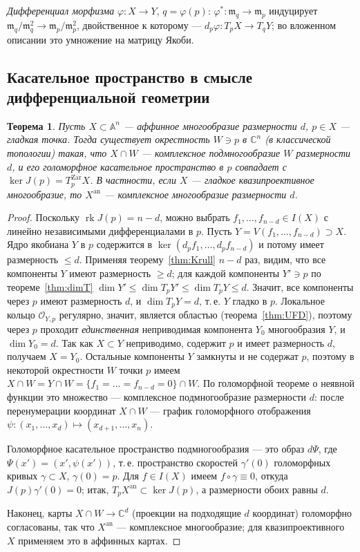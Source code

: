 \documentclass[11pt,a4paper]{article}
\theoremstyle{plain}
\newtheorem{theorem}{Теорема}[section]
\theoremstyle{definition}
\theoremstyle{remark}
\renewcommand{\C}{\mathbb{C}}
\newcommand{\A}{\mathbb{A}}
\newcommand{\cO}{\mathcal{O}}
\newcommand{\mm}{\mathfrak{m}}
\DeclareMathOperator{\rk}{rk}
\newcommand{\an}{\mathrm{an}}
\newcommand{\Zar}{\mathrm{Zar}}
\begin{document}
\emph{Дифференциал морфизма} $\varphi\colon X\to Y$, $q=\varphi(p)$:
$\varphi^*\colon\mm_q\to\mm_p$ индуцирует $\mm_q/\mm_q^2\to\mm_p/\mm_p^2$, двойственное к
которому --- $d_p\varphi\colon T_pX\to T_qY$; во вложенном описании это умножение на матрицу Якоби.

\subsection{Касательное пространство в смысле дифференциальной геометрии}

\begin{theorem}\label{thm:smooth-manifold}
Пусть $X\subset\A^n$ --- аффинное многообразие размерности $d$, $p\in X$ --- гладкая точка.
Тогда существует окрестность $W\ni p$ в $\C^n$ (в классической топологии) такая, что $X\cap W$
--- комплексное подмногообразие $W$ размерности $d$, и его голоморфное касательное
пространство в $p$ совпадает с $\ker J(p)=T^{\Zar}_pX$. В частности, если $X$ --- гладкое
квазипроективное многообразие, то $X^{\an}$ --- комплексное многообразие размерности $d$.
\end{theorem}
\begin{proof}
Поскольку $\rk J(p)=n-d$, можно выбрать $f_1,\dots,f_{n-d}\in I(X)$ с линейно независимыми
дифференциалами в $p$. Пусть $Y=V(f_1,\dots,f_{n-d})\supset X$. Ядро якобиана $Y$ в $p$
содержится в $\ker(d_pf_1,\dots,d_pf_{n-d})$ и потому имеет размерность $\le d$. Применяя
теорему~\ref{thm:Krull} $n-d$ раз, видим, что все компоненты $Y$ имеют размерность $\ge d$; для каждой
компоненты $Y'\ni p$ по теореме~\ref{thm:dimT} $\dim Y'\le\dim T_pY'\le\dim T_pY\le d$. Значит,
все компоненты через $p$ имеют размерность $d$, и $\dim T_pY=d$, т.\,е. $Y$ гладко в $p$. Локальное кольцо $\cO_{Y,p}$ регулярно,
значит, является областью (теорема~\ref{thm:UFD}), поэтому через $p$ проходит
\emph{единственная} неприводимая компонента $Y_0$ многообразия $Y$, и $\dim Y_0=d$. Так как
$X\subset Y$ неприводимо, содержит $p$ и имеет размерность $d$, получаем $X=Y_0$. Остальные
компоненты $Y$ замкнуты и не содержат $p$, поэтому в некоторой окрестности $W$ точки $p$
имеем $X\cap W=Y\cap W=\{f_1=\dots=f_{n-d}=0\}\cap W$. По голоморфной теореме о неявной
функции это множество --- комплексное подмногообразие размерности $d$: после перенумерации
координат $X\cap W$ --- график голоморфного отображения
$\psi\colon(x_1,\dots,x_d)\mapsto(x_{d+1},\dots,x_n)$.

Голоморфное касательное пространство подмногообразия --- это образ $d\Psi$, где
$\Psi(x')=(x',\psi(x'))$, т.\,е. пространство скоростей $\gamma'(0)$ голоморфных кривых
$\gamma\subset X$, $\gamma(0)=p$. Для $f\in I(X)$ имеем $f\circ\gamma\equiv0$, откуда
$J(p)\gamma'(0)=0$; итак, $T_pX^{\an}\subset\ker J(p)$, а размерности обоих равны $d$.

Наконец, карты $X\cap W\to\C^d$ (проекции на подходящие $d$ координат) голоморфно согласованы,
так что $X^{\an}$ --- комплексное многообразие; для квазипроективного $X$ применяем это в
аффинных картах.
\end{proof}
\end{document}
